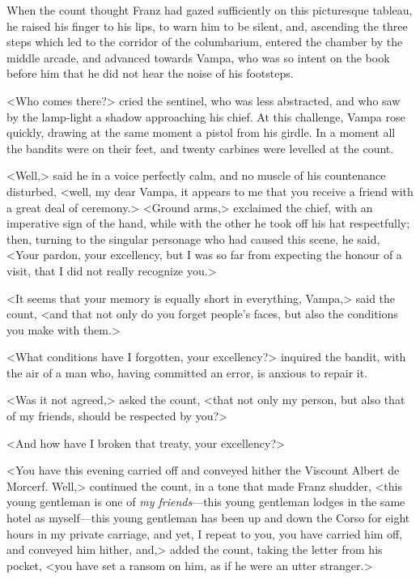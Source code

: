  When the count thought Franz had gazed sufficiently on this picturesque tableau, he raised his finger to his lips, to warn him to be silent, and, ascending the three steps which led to the corridor of the columbarium, entered the chamber by the middle arcade, and advanced towards Vampa, who was so intent on the book before him that he did not hear the noise of his footsteps. 

 <Who comes there?> cried the sentinel, who was less abstracted, and who saw by the lamp-light a shadow approaching his chief. At this challenge, Vampa rose quickly, drawing at the same moment a pistol from his girdle. In a moment all the bandits were on their feet, and twenty carbines were levelled at the count. 

 <Well,> said he in a voice perfectly calm, and no muscle of his countenance disturbed, <well, my dear Vampa, it appears to me that you receive a friend with a great deal of ceremony.>  <Ground arms,> exclaimed the chief, with an imperative sign of the hand, while with the other he took off his hat respectfully; then, turning to the singular personage who had caused this scene, he said, <Your pardon, your excellency, but I was so far from expecting the honour of a visit, that I did not really recognize you.> 

 <It seems that your memory is equally short in everything, Vampa,> said the count, <and that not only do you forget people's faces, but also the conditions you make with them.> 

 <What conditions have I forgotten, your excellency?> inquired the bandit, with the air of a man who, having committed an error, is anxious to repair it. 

 <Was it not agreed,> asked the count, <that not only my person, but also that of my friends, should be respected by you?> 

 <And how have I broken that treaty, your excellency?> 

 <You have this evening carried off and conveyed hither the Viscount Albert de Morcerf. Well,> continued the count, in a tone that made Franz shudder, <this young gentleman is one of \textit{my friends}—this young gentleman lodges in the same hotel as myself—this young gentleman has been up and down the Corso for eight hours in my private carriage, and yet, I repeat to you, you have carried him off, and conveyed him hither, and,> added the count, taking the letter from his pocket, <you have set a ransom on him, as if he were an utter stranger.> 

